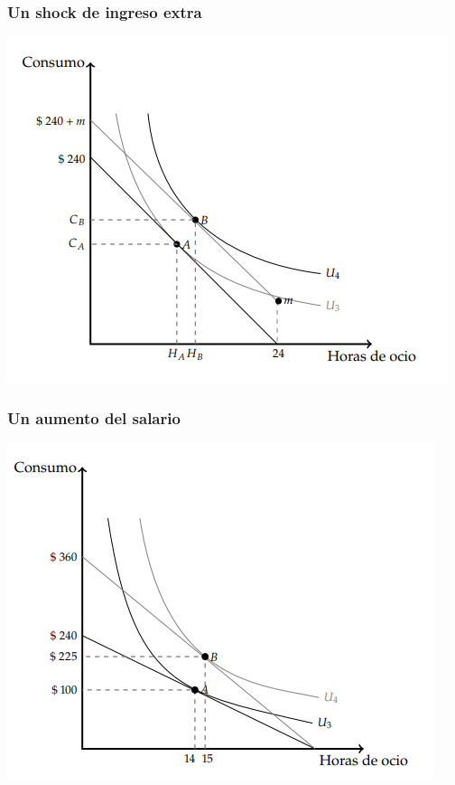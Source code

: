 \documentclass{beamer}
\begin{document}
\begin{frame}
  \frametitle{Un shock de ingreso extra}
  \begin{center}
    \includegraphics[scale=0.8]{../Figures/C9.7.png}
  \end{center}
\end{frame}

\begin{frame}
  \frametitle{Un aumento del salario}
  \begin{center}
    \includegraphics[scale=0.8]{../Figures/C9.8.png}
  \end{center}
\end{frame}
\end{document}
